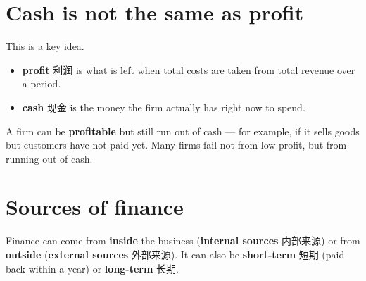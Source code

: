 \documentclass[11pt]{article}
\begin{document}
\section*{Cash is not the same as profit}

This is a key idea.

\begin{itemize}
\item \textbf{profit} 利润 is what is left when total costs are taken from total revenue over a period.

\item \textbf{cash} 现金 is the money the firm actually has right now to spend.

\end{itemize}

A firm can be \textbf{profitable} but still run out of cash — for example, if it sells goods but customers have not paid yet. Many firms fail not from low profit, but from running out of cash.

\section*{Sources of finance}

Finance can come from \textbf{inside} the business (\textbf{internal sources} 内部来源) or from \textbf{outside} (\textbf{external sources} 外部来源). It can also be \textbf{short-term} 短期 (paid back within a year) or \textbf{long-term} 长期.
\end{document}
